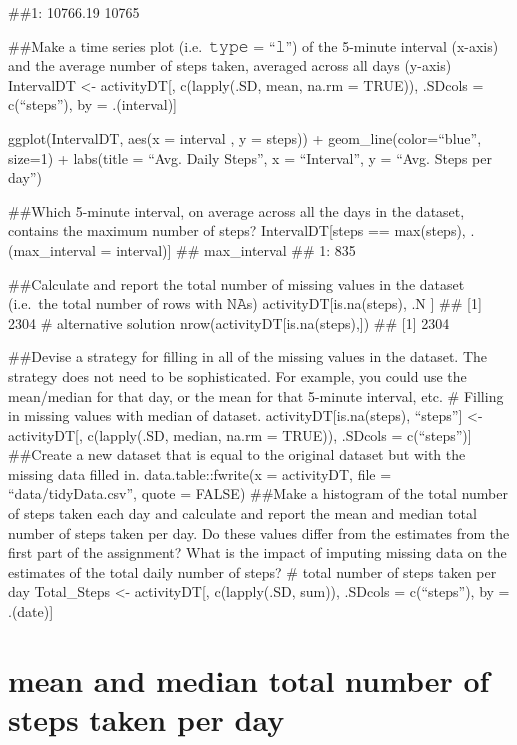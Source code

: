 \documentclass[
]{article}
\begin{document}
\#\#1: 10766.19 10765

\#\#Make a time series plot (i.e.~𝚝𝚢𝚙𝚎 = ``𝚕'') of the 5-minute interval
(x-axis) and the average number of steps taken, averaged across all days
(y-axis) IntervalDT \textless- activityDT{[}, c(lapply(.SD, mean, na.rm
= TRUE)), .SDcols = c(``steps''), by = .(interval){]}

ggplot(IntervalDT, aes(x = interval , y = steps)) +
geom\_line(color=``blue'', size=1) + labs(title = ``Avg. Daily Steps'',
x = ``Interval'', y = ``Avg. Steps per day'')

\#\#Which 5-minute interval, on average across all the days in the
dataset, contains the maximum number of steps? IntervalDT{[}steps ==
max(steps), .(max\_interval = interval){]} \#\# max\_interval \#\# 1:
835

\#\#Calculate and report the total number of missing values in the
dataset (i.e.~the total number of rows with 𝙽𝙰s)
activityDT{[}is.na(steps), .N {]} \#\# {[}1{]} 2304 \# alternative
solution nrow(activityDT{[}is.na(steps),{]}) \#\# {[}1{]} 2304

\#\#Devise a strategy for filling in all of the missing values in the
dataset. The strategy does not need to be sophisticated. For example,
you could use the mean/median for that day, or the mean for that
5-minute interval, etc. \# Filling in missing values with median of
dataset. activityDT{[}is.na(steps), ``steps''{]} \textless-
activityDT{[}, c(lapply(.SD, median, na.rm = TRUE)), .SDcols =
c(``steps''){]} \#\#Create a new dataset that is equal to the original
dataset but with the missing data filled in. data.table::fwrite(x =
activityDT, file = ``data/tidyData.csv'', quote = FALSE) \#\#Make a
histogram of the total number of steps taken each day and calculate and
report the mean and median total number of steps taken per day. Do these
values differ from the estimates from the first part of the assignment?
What is the impact of imputing missing data on the estimates of the
total daily number of steps? \# total number of steps taken per day
Total\_Steps \textless- activityDT{[}, c(lapply(.SD, sum)), .SDcols =
c(``steps''), by = .(date){]}

\hypertarget{mean-and-median-total-number-of-steps-taken-per-day}{%
\section{mean and median total number of steps taken per
day}\label{mean-and-median-total-number-of-steps-taken-per-day}}
\end{document}
